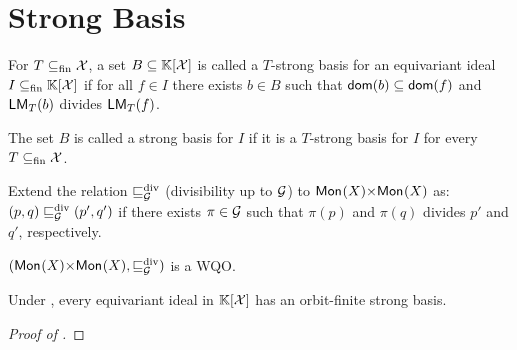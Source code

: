 \section{Strong Basis}\label{sec:strong}
%
\begin{definition}\label{def:strong}
For $T\subseteqfin\X$, a set $B\subseteq\poly{\K}{\X}$ is called a $T$-strong basis for an equivariant ideal $I\subseteqfin\poly{\K}{\X}$ if for all $f\in I$ there exists $b\in B$ such that $\dom(b) \subseteq \dom(f)$ and $\lm[T](b)$ divides $\lm[T](f)$.

The set $B$ is called a strong basis for $I$ if it is a $T$-strong basis for $I$ for every $T\subseteqfin \X$.
\end{definition}
%
\begin{definition}
Extend the relation $\gdivleq$ (divisibility up to $\group$) to $\mon{X}{\times}\mon{X}$ as:
$(p,q)\gdivleq (p',q')$ if there exists $\pi\in\group$ such that $\pi(p)$ and $\pi(q)$ divides $p'$ and $q'$, respectively.
\end{definition}
%
\begin{assumption}\label{assume:mon mon wqo}
$(\mon{X}{\times}\mon{X},\gdivleq)$ is a WQO.
\end{assumption}
%
\begin{lemma}\label{lem:strong exists}
Under , every equivariant ideal in $\poly{\K}{\X}$ has an orbit-finite strong basis.
\end{lemma}
%
\begin{proof}[Proof of ]

\end{proof}
%
